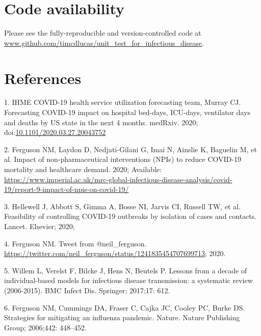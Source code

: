 \documentclass[10pt,letterpaper]{article}
\begin{document}
\hypertarget{code-availability}{%
\section{Code availability}\label{code-availability}}

Please see the fully-reproducible and version-controlled code at \url{www.github.com/timcdlucas/unit_test_for_infectious_disease}.

\hypertarget{references}{%
\section*{References}\label{references}}

\hypertarget{refs}{}
\leavevmode\hypertarget{ref-ihme}{}%
1. IHME COVID-19 health service utilization forecasting team, Murray CJ. Forecasting COVID-19 impact on hospital bed-days, ICU-days, ventilator days and deaths by US state in the next 4 months. medRxiv. 2020; doi:\href{https://doi.org/10.1101/2020.03.27.20043752}{10.1101/2020.03.27.20043752}

\leavevmode\hypertarget{ref-imperial}{}%
2. Ferguson NM, Laydon D, Nedjati-Gilani G, Imai N, Ainslie K, Baguelin M, et al. Impact of non-pharmaceutical interventions (NPIs) to reduce COVID-19 mortality and healthcare demand. 2020; Available: \url{https://www.imperial.ac.uk/mrc-global-infectious-disease-analysis/covid-19/report-9-impact-of-npis-on-covid-19/}

\leavevmode\hypertarget{ref-hellewell2020feasibility}{}%
3. Hellewell J, Abbott S, Gimma A, Bosse NI, Jarvis CI, Russell TW, et al. Feasibility of controlling COVID-19 outbreaks by isolation of cases and contacts. Lancet. Elsevier; 2020;

\leavevmode\hypertarget{ref-ferg_tweet}{}%
4. Ferguson NM. Tweet from @neil\_ferguson. \url{https://twitter.com/neil_ferguson/status/1241835454707699713}; 2020.

\leavevmode\hypertarget{ref-willem2017lessons}{}%
5. Willem L, Verelst F, Bilcke J, Hens N, Beutels P. Lessons from a decade of individual-based models for infectious disease transmission: a systematic review (2006-2015). BMC Infect Dis. Springer; 2017;17: 612.

\leavevmode\hypertarget{ref-ferguson2006strategies}{}%
6. Ferguson NM, Cummings DA, Fraser C, Cajka JC, Cooley PC, Burke DS. Strategies for mitigating an influenza pandemic. Nature. Nature Publishing Group; 2006;442: 448--452.
\end{document}
